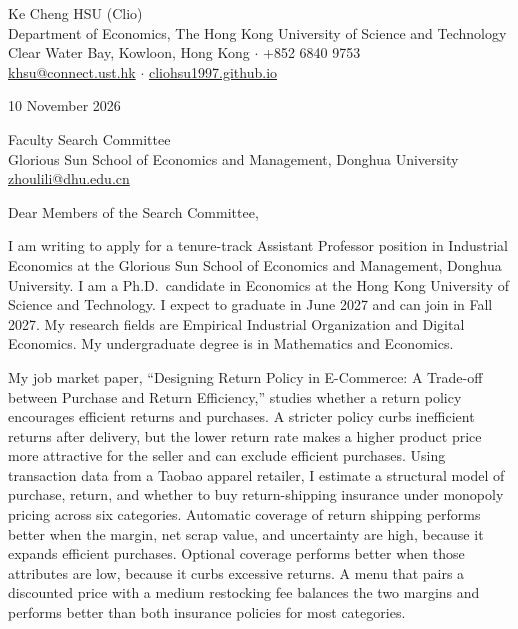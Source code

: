\documentclass[11pt]{article}
\begin{document}
\begin{flushleft}
Ke Cheng HSU (Clio) \\
Department of Economics, The Hong Kong University of Science and Technology \\
Clear Water Bay, Kowloon, Hong Kong $\cdot$ +852 6840 9753 \\
\href{mailto:khsu@connect.ust.hk}{khsu@connect.ust.hk} $\cdot$ \href{https://cliohsu1997.github.io/}{cliohsu1997.github.io}
\end{flushleft}

10 November 2026

\vspace{0.2em}
Faculty Search Committee \\
Glorious Sun School of Economics and Management, Donghua University \\
\href{mailto:zhoulili@dhu.edu.cn}{zhoulili@dhu.edu.cn}

\vspace{0.2em}
Dear Members of the Search Committee,

I am writing to apply for a tenure-track Assistant Professor position in Industrial Economics at the Glorious Sun School of Economics and Management, Donghua University. I am a Ph.D.\ candidate in Economics at the Hong Kong University of Science and Technology. I expect to graduate in June 2027 and can join in Fall 2027. My research fields are Empirical Industrial Organization and Digital Economics. My undergraduate degree is in Mathematics and Economics.

My job market paper, ``Designing Return Policy in E-Commerce: A Trade-off between Purchase and Return Efficiency,'' studies whether a return policy encourages efficient returns and purchases. A stricter policy curbs inefficient returns after delivery, but the lower return rate makes a higher product price more attractive for the seller and can exclude efficient purchases. Using transaction data from a Taobao apparel retailer, I estimate a structural model of purchase, return, and whether to buy return-shipping insurance under monopoly pricing across six categories. Automatic coverage of return shipping performs better when the margin, net scrap value, and uncertainty are high, because it expands efficient purchases. Optional coverage performs better when those attributes are low, because it curbs excessive returns. A menu that pairs a discounted price with a medium restocking fee balances the two margins and performs better than both insurance policies for most categories.
\end{document}
